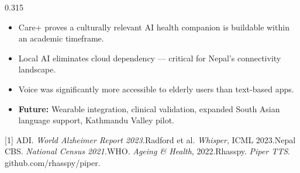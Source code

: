 \documentclass[final]{beamer}
\begin{document}
\begin{frame}[t]{}
\begin{columns}[t, totalwidth=\linewidth]
\begin{column}{0.315\linewidth}
\begin{tcolorbox}[posterbox, title={CONCLUSION \& FUTURE SCOPE}]
  \begin{itemize}
    \item Care+ proves a culturally relevant AI health companion is buildable
      within an academic timeframe.
    \item Local AI eliminates cloud dependency --- critical for Nepal's
      connectivity landscape.
    \item Voice was significantly more accessible to elderly users than
      text-based apps.
    \item \textbf{Future:} Wearable integration, clinical validation,
      expanded South Asian language support, Kathmandu Valley pilot.
  \end{itemize}
\end{tcolorbox}

\vspace{3mm}

\begin{tcolorbox}[posterbox, title={REFERENCES}]
  {\footnotesize
    [1] ADI. \textit{World Alzheimer Report 2023.}\;
    [2] Radford et al. \textit{Whisper}, ICML 2023.\;
    [3] Nepal CBS. \textit{National Census 2021.}\;
    [4] WHO. \textit{Ageing \& Health}, 2022.\;
    [5] Rhasspy. \textit{Piper TTS}. github.com/rhasspy/piper.}
\end{tcolorbox}

\end{column}
\end{columns}
\end{frame}
\end{document}
